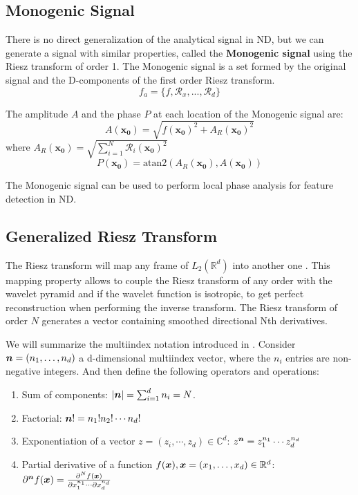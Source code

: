 \subsection{Monogenic Signal}
\label{sub:monogenic}

There is no direct generalization of the analytical signal in ND, but we can generate a signal with similar properties, called the \textbf{Monogenic signal} using the Riesz transform of order 1\cite{felsberg_monogenic_2001, kovesi_image_1999}.
The Monogenic signal is a set formed by the original signal and the D-components of the first order Riesz transform.
\begin{equation}
  f_a = \{f, \mathcal{R}_x, ..., \mathcal{R}_d\}
\end{equation}

The amplitude $A$ and the phase $P$ at each location of the Monogenic signal are:
\begin{equation}
\label{eq:monogenic_amplitude}
 A(\mathbf{x_0})= \sqrt{f(\mathbf{x_0})^2 + A_R(\mathbf{x_0})^2 }
\end{equation}
where $ A_R(\mathbf{x_0})=  \sqrt{\sum_{i=1}^N \mathcal{R}_i(\mathbf{x_0})^2} $
\begin{equation}
\label{eq:monogenic_phase}
P(\mathbf{x_0})= \text{atan2}(A_R(\mathbf{x_0}),A(\mathbf{x_0}))
\end{equation}

The Monogenic signal can be used to perform local phase analysis for feature detection in ND.

\subsection{Generalized Riesz Transform}
\label{sub:generalized_riesz}
The Riesz transform will map any frame of $L_2(\mathbb{R}^d)$ into another one \cite{held_steerable_2010, unser_wavelet_2010}. This mapping property allows to couple the Riesz transform of any order with the wavelet pyramid and if the wavelet function is isotropic, to get perfect reconstruction when performing the inverse transform. The Riesz transform of order $N$ generates a vector containing smoothed directional Nth derivatives.

We will summarize the multiindex notation introduced in \cite{unser_steerable_2011}.\newline
Consider $ \bm{n} = (n_{1}, \ldots, n_{d})$ a d-dimensional multiindex vector, where the $n_i$ entries are non-negative integers. And then define the following operators and operations:
\begin{enumerate}[topsep=0pt]
  \item Sum of components: $\abs{\bm{n}} = \sum_{i=1}^d n_i = N$.
  \item Factorial: $\bm{n}! = n_1!n_2!\cdots n_d!$
  \item Exponentiation of a vector $z = (z_i,\cdots,z_d) \in \mathbb{C}^d$:
    $z^{\bm{n}} = z_{1}^{n_1} \cdots z_{d}^{n_d}$
  \item Partial derivative of a function $f(\bm{x}), \bm{x} = (x_1,\ldots, x_d) \in \mathbb{R}^d$:
    $\partial^{\bm{n}}f(\bm{x}) = \frac{\partial^{N}f(\bm{x})}{\partial x_{1}^{n_1}\cdots \partial x_{d}^{n_d}}$
\end{enumerate}

